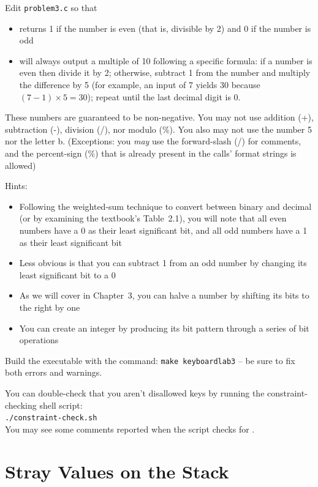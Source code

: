 Edit \texttt{problem3.c} so that
\begin{itemize}
\item {} returns 1 if the number is even (that is,
    divisible by 2) and 0 if the number is odd
\item {} will always output a multiple of
    10 following a specific formula: if a number is even then divide it by
    2; otherwise, subtract 1 from the number and multiply the difference
    by 5 (for example, an input of 7 yields 30 because $(7-1) \times 5 = 30$);
    repeat until the last decimal digit is 0.
\end{itemize}
These numbers are guaranteed to be non-negative. You may not use addition (+),
subtraction (-), division (/), nor modulo (\%). You also may not use the
number 5 nor the letter b. (Exceptions: you \textit{may} use the forward-slash
(/) for comments, and the percent-sign (\%) that is already present in the
 calls' format strings is allowed)

Hints:
\begin{itemize}
\item Following the weighted-sum technique to convert between binary and
    decimal (or by examining the textbook's Table~2.1), you will note that all
    even numbers have a 0 as their least significant bit, and all odd numbers
    have a 1 as their least significant bit
\item Less obvious is that you can subtract 1 from an odd number by changing
    its least significant bit to a 0
\item As we will cover in Chapter~3, you can halve a number by shifting its
    bits to the right by one
\item You can create an integer by producing its bit pattern through a series
    of bit operations
\end{itemize}

Build the executable with the command: \texttt{make keyboardlab3} -- be sure to
fix both errors and warnings.

You can double-check that you aren't disallowed keys by running the
constraint-checking shell script: \\
\texttt{./constraint-check.sh} \\
You may see some comments reported when the script checks for
\textquotesingle *\textquotesingle.


\section{Stray Values on the Stack}

